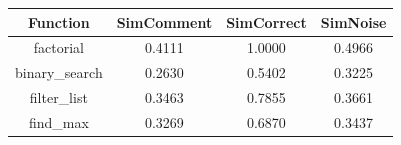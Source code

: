 \begin{table}[h]
\centering
\begin{tabular}{ |c|c|c|c| }
\hline
Function & SimComment & SimCorrect & SimNoise \\
\hline
factorial & 0.4111 & 1.0000 & 0.4966 \\
\hline
binary\_search & 0.2630 & 0.5402 & 0.3225 \\
\hline
filter\_list & 0.3463 & 0.7855 & 0.3661 \\
\hline
find\_max & 0.3269 & 0.6870 & 0.3437 \\
\hline
\end{tabular}
\end{table}
